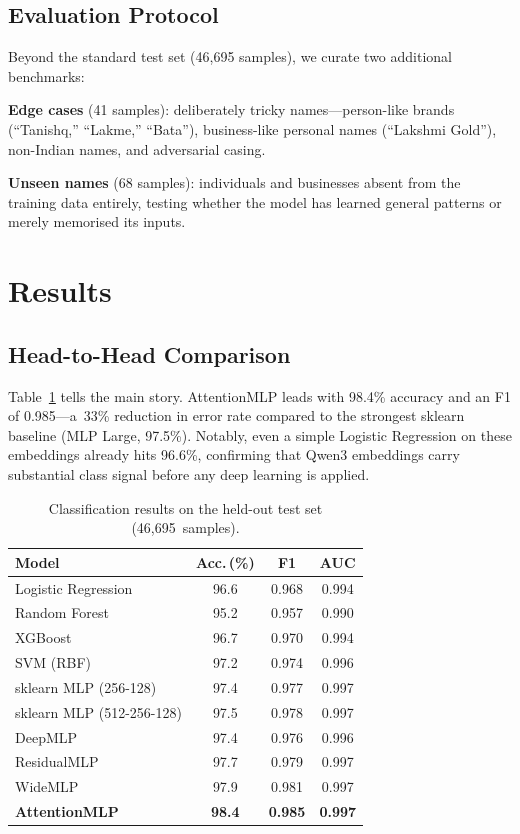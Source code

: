 \documentclass[conference]{IEEEtran}
\begin{document}
\subsection{Evaluation Protocol}

Beyond the standard test set (46{,}695 samples), we curate two additional benchmarks:

\textbf{Edge cases} (41 samples): deliberately tricky names---person-like brands (``Tanishq,'' ``Lakme,'' ``Bata''), business-like personal names (``Lakshmi Gold''), non-Indian names, and adversarial casing.

\textbf{Unseen names} (68 samples): individuals and businesses absent from the training data entirely, testing whether the model has learned general patterns or merely memorised its inputs.

\section{Results}
\label{sec:results}

\subsection{Head-to-Head Comparison}

Table~\ref{tab:models} tells the main story. AttentionMLP leads with 98.4\% accuracy and an F1 of 0.985---a~33\% reduction in error rate compared to the strongest sklearn baseline (MLP Large, 97.5\%). Notably, even a simple Logistic Regression on these embeddings already hits 96.6\%, confirming that Qwen3 embeddings carry substantial class signal before any deep learning is applied.

\begin{table}[!t]
\caption{Classification results on the held-out test set (46{,}695~samples).}
\label{tab:models}
\centering
\begin{tabular}{@{}lccc@{}}
\toprule
\textbf{Model} & \textbf{Acc.\,(\%)} & \textbf{F1} & \textbf{AUC} \\
\midrule
Logistic Regression      & 96.6 & 0.968 & 0.994 \\
Random Forest            & 95.2 & 0.957 & 0.990 \\
XGBoost                  & 96.7 & 0.970 & 0.994 \\
SVM (RBF)                & 97.2 & 0.974 & 0.996 \\
sklearn MLP (256-128)    & 97.4 & 0.977 & 0.997 \\
sklearn MLP (512-256-128)& 97.5 & 0.978 & 0.997 \\
\midrule
DeepMLP                  & 97.4 & 0.976 & 0.996 \\
ResidualMLP              & 97.7 & 0.979 & 0.997 \\
WideMLP                  & 97.9 & 0.981 & 0.997 \\
\textbf{AttentionMLP}    & \textbf{98.4} & \textbf{0.985} & \textbf{0.997} \\
\bottomrule
\end{tabular}
\end{table}
\end{document}

